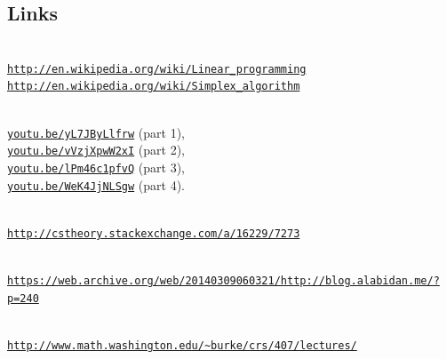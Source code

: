 \documentclass[11pt,oneside]{article}
\begin{document}
		
	\subsection{Links}

		 \\
		\href{http://en.wikipedia.org/wiki/Linear_programming}{\texttt{http://en.wikipedia.org/wiki/Linear\_programming}} \\ 
		\href{http://en.wikipedia.org/wiki/Simplex_algorithm}{\texttt{http://en.wikipedia.org/wiki/Simplex\_algorithm}}

		\medskip
		 \\
		\href{https://youtu.be/yL7JByLlfrw} 
			{\texttt{youtu.be/yL7JByLlfrw}} (part 1), \\
		\href{https://youtu.be/vVzjXpwW2xI}
			{\texttt{youtu.be/vVzjXpwW2xI}} (part 2), \\
		\href{https://youtu.be/lPm46c1pfvQ}
			{\texttt{youtu.be/lPm46c1pfvQ}} (part 3),  \\
		\href{https://youtu.be/WeK4JjNLSgw}
			{\texttt{youtu.be/WeK4JjNLSgw}} (part 4).


		\medskip
		 \\
		\href{http://cstheory.stackexchange.com/a/16229/7273}
			{\texttt{http://cstheory.stackexchange.com/a/16229/7273}}

		\medskip
		 \\ 
		\href{https://web.archive.org/web/20140309060321/http://blog.alabidan.me/?p=240}
			{\texttt{https://web.archive.org/web/20140309060321/http://blog.alabidan.me/?p=240}}

		\medskip
		 \\
		\href{http://www.math.washington.edu/~burke/crs/407/lectures/}
	            {\texttt{http://www.math.washington.edu/\textasciitilde{}burke/crs/407/lectures/}}
\end{document}
